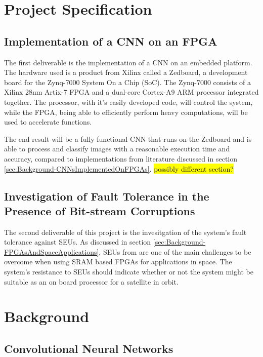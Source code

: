 \documentclass[11pt]{article}
\begin{document}
\section{Project Specification}
\label{sec:ProjSpec}

\subsection{Implementation of a CNN on an FPGA}
\label{sec:ProjSpec-ImplementationOfACNNOnAnFPGA}

The first deliverable is the implementation of a CNN on an embedded platform. The hardware used is a product from Xilinx called a Zedboard, a development board for the Zynq-7000 System On a Chip (SoC). The Zynq-7000 consists of a Xilinx 28nm Artix-7 FPGA and a dual-core Cortex-A9 ARM processor integrated together. The processor, with it's easily developed code, will control the system, while the FPGA, being able to efficiently perform heavy computations, will be used to accelerate functions.

The end result will be a fully functional CNN that runs on the Zedboard and is able to process and classify images with a reasonable execution time and accuracy, compared to implementations from literature discussed in section \ref{sec:Background-CNNsImplementedOnFPGAs}. \hl{possibly different section?}

\subsection{Investigation of Fault Tolerance in the Presence of Bit-stream Corruptions}
\label{sec:ProjSpec-InvestigationOfFaultToleranceInThePresenceOfBitstreamCorruptions}

The second deliverable of this project is the invesitgation of the system's fault tolerance against SEUs. As discussed in section \ref{sec:Background-FPGAsAndSpaceApplications}, SEUs from are one of the main challenges to be overcome when using SRAM based FPGAs for applications in space. The system's resistance to SEUs should indicate whether or not the system might be suitable as an on board processor for a satellite in orbit.

\section{Background}
\label{sec:Background}

\subsection{Convolutional Neural Networks}
\label{sec:Background-CNN}
\end{document}
